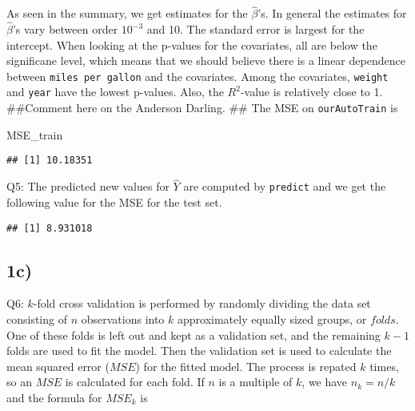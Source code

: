 \documentclass[]{article}
\newenvironment{Shaded}{\begin{snugshade}}{\end{snugshade}}
\newcommand{\KeywordTok}[1]{\textcolor[rgb]{0.13,0.29,0.53}{\textbf{#1}}}
\newcommand{\DecValTok}[1]{\textcolor[rgb]{0.00,0.00,0.81}{#1}}
\newcommand{\OperatorTok}[1]{\textcolor[rgb]{0.81,0.36,0.00}{\textbf{#1}}}
\newcommand{\NormalTok}[1]{#1}
\begin{document}
As seen in the summary, we get estimates for the \(\hat\beta\)'s. In
general the estimates for \(\hat\beta\)'s vary between order \(10^{-3}\)
and 10. The standard error is largest for the intercept. When looking at
the p-values for the covariates, all are below the significane level,
which means that we should believe there is a linear dependence between
\texttt{miles\ per\ gallon} and the covariates. Among the covariates,
\texttt{weight} and \texttt{year} have the lowest p-values. Also, the
\(R^2\)-value is relatively close to 1. \#\#Comment here on the Anderson
Darling. \#\# The MSE on \texttt{ourAutoTrain} is

\begin{Shaded}
\begin{Highlighting}[]
\NormalTok{MSE_train}
\end{Highlighting}
\end{Shaded}

\begin{verbatim}
## [1] 10.18351
\end{verbatim}

Q5: The predicted new values for \(\hat Y\) are computed by
\texttt{predict} and we get the following value for the MSE for the test
set.

\begin{Shaded}
\end{Shaded}

\begin{verbatim}
## [1] 8.931018
\end{verbatim}

\subsection{1c)}\label{c}

Q6: \(k\)-fold cross validation is performed by randomly dividing the
data set consisting of \(n\) observations into \(k\) approximately
equally sized groups, or \(folds\). One of these folds is left out and
kept as a validation set, and the remaining \(k-1\) folds are used to
fit the model. Then the validation set is used to calculate the mean
squared error (\(MSE\)) for the fitted model. The process is repated
\(k\) times, so an \(MSE\) is calculated for each fold. If \(n\) is a
multiple of \(k\), we have \(n_k=n/k\) and the formula for \(MSE_k\) is
\end{document}
